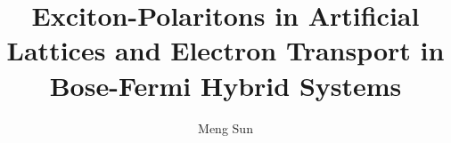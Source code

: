 \documentclass{ustthesis}  %
\title{Exciton-Polaritons in Artificial Lattices and Electron Transport in Bose-Fermi Hybrid Systems}   %
\author{Meng Sun}             %
\begin{document}
\setcounter{secnumdepth}{3}
\setcounter{tocdepth}{3}




\maketitle                  %

%
\begin{romanpages}          %
\tableofcontents            %
\listoffigures              %
\end{romanpages}            %
\end{document}
